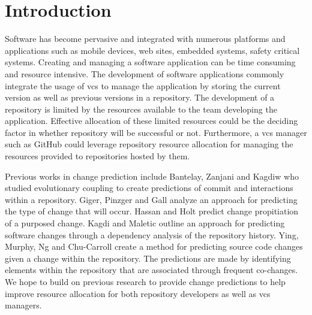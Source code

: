\chapter{Introduction}
\label{chap:introduction}

Software has become pervasive and integrated with numerous platforms and applications such as mobile devices, web sites, embedded systems, safety critical systems. Creating and managing a software application can be time consuming and resource intensive. The development of software applications commonly integrate the usage of \gls{vcs} to manage the application by storing the current version as well as previous versions in a repository. The development of a repository is limited by the resources available to the team developing the application. Effective allocation of these limited resources could be the deciding factor in whether repository will be successful or not. Furthermore, a \gls{vcs} manager such as GitHub could leverage repository resource allocation for managing the resources provided to repositories hosted by them.


Previous works in change prediction include Bantelay, Zanjani and Kagdiw who studied evolutionary coupling to create predictions of commit and interactions within a repository\cite{Bantelay2013}. Giger, Pinzger and Gall analyze an approach for predicting the type of change that will occur. Hassan and Holt predict change propitiation of a purposed change. Kagdi and Maletic outline an approach for predicting software changes through a dependency analysis of the repository history. Ying, Murphy, Ng and Chu-Carroll create a method for predicting source code changes given a change within the repository. The predictions are made by identifying elements within the repository that are associated through frequent co-changes. We hope to build on previous research to provide change predictions to help improve resource allocation for both repository developers as well as \gls{vcs} managers.



